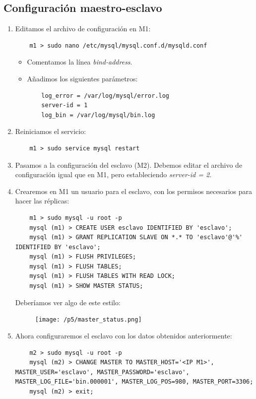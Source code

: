 \documentclass[12pt,spanish]{article}
\begin{document}
\subsection{Configuración maestro-esclavo}
\begin{enumerate}
	\item Editamos el archivo de configuración en M1:
	\begin{lstlisting}
	m1 > sudo nano /etc/mysql/mysql.conf.d/mysqld.conf
	\end{lstlisting}
		\begin{itemize}
			\item Comentamos la línea \emph{bind-address}.
			\item Añadimos los siguientes parámetros:
			\begin{lstlisting}
	log_error = /var/log/mysql/error.log
	server-id = 1
	log_bin = /var/log/mysql/bin.log
			\end{lstlisting}
		\end{itemize}
	\item Reiniciamos el servicio:
	\begin{lstlisting}
	m1 > sudo service mysql restart
	\end{lstlisting}
	\item Pasamos a la configuración del esclavo (M2). Debemos editar el archivo de configuración igual que en M1, pero estableciendo \emph{server-id = 2}.
	\item Crearemos en M1 un usuario para el esclavo, con los permisos necesarios para hacer las réplicas:
	\begin{lstlisting}
	m1 > sudo mysql -u root -p
	mysql (m1) > CREATE USER esclavo IDENTIFIED BY 'esclavo';
	mysql (m1) > GRANT REPLICATION SLAVE ON *.* TO 'esclavo'@'%' IDENTIFIED BY 'esclavo';
	mysql (m1) > FLUSH PRIVILEGES;
	mysql (m1) > FLUSH TABLES;
	mysql (m1) > FLUSH TABLES WITH READ LOCK;
	mysql (m1) > SHOW MASTER STATUS;
	\end{lstlisting}
	Deberíamos ver algo de este estilo:
	\begin{figure}[H]
		\centering
		\texttt{[image: /p5/master\_status.png]}
	\end{figure}
	\item Ahora configuraremos el esclavo con los datos obtenidos anteriormente:
	\begin{lstlisting}
	m2 > sudo mysql -u root -p
	mysql (m2) > CHANGE MASTER TO MASTER_HOST='<IP M1>', MASTER_USER='esclavo', MASTER_PASSWORD='esclavo', MASTER_LOG_FILE='bin.000001', MASTER_LOG_POS=980, MASTER_PORT=3306;
	mysql (m2) > exit;

\end{lstlisting}
\end{enumerate}
\end{document}
